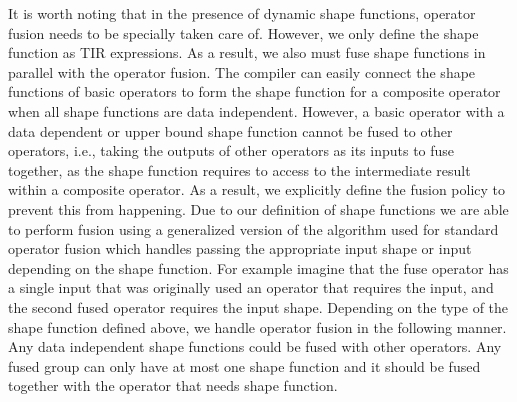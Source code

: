 It is worth noting that in the presence of dynamic shape functions,
  operator fusion needs to be specially taken care of.
However, we only define the shape function as TIR expressions.
As a result, we also must fuse shape functions in
  parallel with the operator fusion.
The compiler can easily connect the shape
  functions of basic operators to form the shape function
  for a composite operator when all shape functions are data independent.
However, a basic operator with a data dependent or upper bound shape
  function cannot be fused to other operators,
  i.e., taking the outputs of other operators as its inputs to fuse together,
  as the shape function requires to access to the intermediate result
  within a composite operator.
As a result, we explicitly define the fusion policy to prevent
  this from happening.
Due to our definition of shape functions we are able to perform fusion
  using a generalized version of the algorithm used for
  standard operator fusion which handles passing the
  appropriate input shape or input depending on the shape function.
For example imagine that the fuse operator has a single input that
  was originally used an operator that requires the input,
  and the second fused operator requires the input shape.
Depending on the type of the shape function defined above,
  we handle operator fusion in the following manner.
Any data independent shape functions could be fused with other operators.
Any fused group can only have at most one shape function and it
  should be fused together with the operator that needs shape function.
